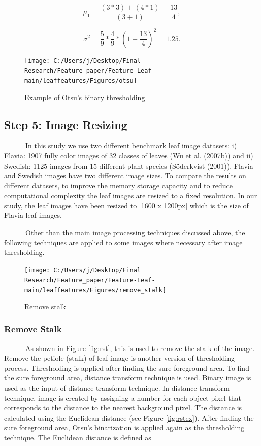 \documentclass{article}
\begin{document}
\[\mu_1 = \frac{(3*3) +(4*1)}{(3+1)} = \frac{13}{4},\]

\[\sigma^2 = \frac{5}{9} * \frac{4}{9} * (1-\frac{13}{4})^2 = 1.25.\]

\begin{figure}[!ht]

{\centering \texttt{[image: C:/Users/j/Desktop/Final Research/Feature\_paper/Feature-Leaf-main/leaffeatures/Figures/otsu]} 

}

\caption{\label{fig:otsu}Example of Otsu's binary thresholding}\label{fig:unnamed-chunk-6}
\end{figure}

\hypertarget{step-5-image-resizing}{%
\subsection{Step 5: Image Resizing}\label{step-5-image-resizing}}

~~~~~~In this study we use two different benchmark leaf image datasets:
i) Flavia: 1907 fully color images of 32 classes of leaves (Wu et al.
(2007b)) and ii) Swedish: 1125 images from 15 different plant species
(Söderkvist (2001)). Flavia and Swedish images have two different image
sizes. To compare the results on different datasets, to improve the
memory storage capacity and to reduce computational complexity the leaf
images are resized to a fixed resolution. In our study, the leaf images
have been resized to {[}1600 x 1200px{]} which is the size of Flavia
leaf images.

~~~~~~Other than the main image processing techniques discussed above,
the following techniques are applied to some images where necessary
after image thresholding.

\begin{figure}[!ht]

{\centering \texttt{[image: C:/Users/j/Desktop/Final Research/Feature\_paper/Feature-Leaf-main/leaffeatures/Figures/remove\_stalk]} 

}

\caption{\label{fig:rst}Remove stalk}\label{fig:unnamed-chunk-7}
\end{figure}

\hypertarget{remove-stalk}{%
\subsubsection{Remove Stalk}\label{remove-stalk}}

~~~~~~As shown in Figure \ref{fig:rst}, this is used to remove the stalk
of the image. Remove the petiole (stalk) of leaf image is another
version of thresholding process. Thresholding is applied after finding
the sure foreground area. To find the sure foreground area, distance
transform technique is used. Binary image is used as the input of
distance transform technique. In distance transform technique, image is
created by assigning a number for each object pixel that corresponds to
the distance to the nearest background pixel. The distance is calculated
using the Euclidean distance (see Figure \ref{fig:rstex}). After finding
the sure foreground area, Otsu's binarization is applied again as the
thresholding technique. The Euclidean distance is defined as
\end{document}
